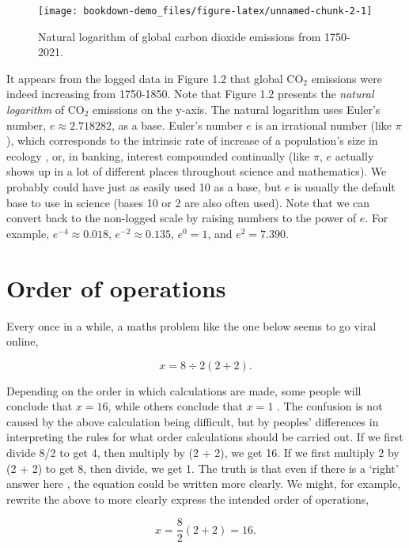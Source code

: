 \documentclass[
]{scrbook}
\begin{document}
\begin{figure}
\texttt{[image: bookdown-demo\_files/figure-latex/unnamed-chunk-2-1]} \caption{Natural logarithm of global carbon dioxide emissions from 1750-2021.}\label{fig:unnamed-chunk-2}
\end{figure}

It appears from the logged data in Figure 1.2 that global CO\(_{2}\) emissions were indeed increasing from 1750-1850.
Note that Figure 1.2 presents the \emph{natural logarithm} of CO\(_{2}\) emissions on the y-axis.
The natural logarithm uses Euler's number, \(e \approx 2.718282\), as a base.
Euler's number \(e\) is an irrational number (like \(\pi\)), which corresponds to the intrinsic rate of increase of a population's size in ecology \citep{Gotelli2001}, or, in banking, interest compounded continually (like \(\pi\), \(e\) actually shows up in a lot of different places throughout science and mathematics).
We probably could have just as easily used 10 as a base, but \(e\) is usually the default base to use in science (bases 10 or 2 are also often used).
Note that we can convert back to the non-logged scale by raising numbers to the power of \(e\).
For example, \(e^{-4} \approx 0.018\), \(e^{-2} \approx 0.135\), \(e^{0} = 1\), and \(e^{2} = 7.390\).

\hypertarget{order-of-operations}{%
\section{Order of operations}\label{order-of-operations}}

Every once in a while, a maths problem like the one below seems to go viral online,

\[x = 8 \div 2\left(2+2\right).\]

Depending on the order in which calculations are made, some people will conclude that \(x = 16\), while others conclude that \(x = 1\) \citep{Chernoff2022}.
The confusion is not caused by the above calculation being difficult, but by peoples' differences in interpreting the rules for what order calculations should be carried out.
If we first divide 8/2 to get 4, then multiply by (2 + 2), we get 16.
If we first multiply 2 by (2 + 2) to get 8, then divide, we get 1.
The truth is that even if there is a `right' answer here \citep{Chernoff2022}, the equation could be written more clearly.
We might, for example, rewrite the above to more clearly express the intended order of operations,

\[x = \frac{8}{2}\left(2 + 2\right) = 16.\]
\end{document}
